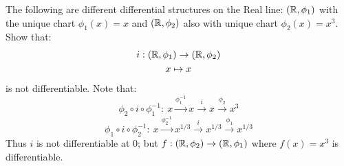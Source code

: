 \begin{examples}
The following are different differential structures on the Real line: $(\mathbb{R},\phi_1)$ with the unique chart $\phi_1(x)=x$ and $(\mathbb{R},\phi_2)$  also with unique chart $\phi_2(x)=x^3$. Show that: 
\begin{gather*}
i: (\mathbb{R},\phi_1) \to (\mathbb{R},\phi_2)\\
x\mapsto x
\end{gather*}
is not differentiable.
Note that:
$$ \phi_2\circ i\circ \phi^{-1}_1 :\  x \xrightarrow{\phi _1^{-1} } x \xrightarrow{i} x \xrightarrow{\phi_2} x^3 $$
$$ \phi_1\circ i\circ \phi^{-1}_2 :\  x \xrightarrow{\phi_2 ^{-1} } x^{1/3} \xrightarrow{i} x^{1/3} \xrightarrow{\phi_1} x^{1/3} $$
Thus $i$ is not differentiable at 0; but $f:(\mathbb{R},\phi_2)\to (\mathbb{R},\phi_1)$ where $f(x)=x^3$ is differentiable.
\end{examples}

